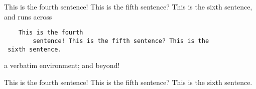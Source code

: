 This is the fourth
sentence! This is the fifth sentence? This is the
sixth sentence, and runs across
\begin{verbatim}
    This is the fourth
        sentence! This is the fifth sentence? This is the
 sixth sentence.
\end{verbatim}
a verbatim environment;
and beyond!

This is the fourth
sentence! This is the fifth sentence? This is the
sixth sentence.
